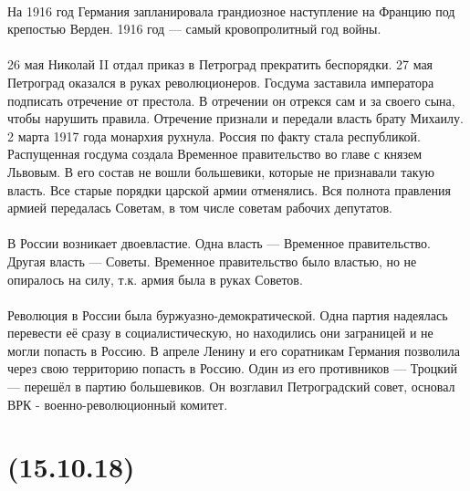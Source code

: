 \documentclass[dvipdfmx]{article}
\begin{document}
\paragraph{}
На 1916 год Германия запланировала грандиозное наступление на Францию под крепостью Верден.
1916 год --- самый кровопролитный год войны.

\paragraph{}
26 мая Николай II отдал приказ в Петроград прекратить беспорядки.
27 мая Петроград оказался в руках революционеров.
Госдума заставила императора подписать отречение от престола. В отречении он отрекся сам и за своего сына, чтобы нарушить
правила. Отречение признали и передали власть брату Михаилу.
2 марта 1917 года монархия рухнула. Россия по факту стала республикой. Распущенная госдума создала Временное правительство
во главе с князем Львовым. В его состав не вошли большевики, которые не признавали такую власть.
Все старые порядки царской армии отменялись. Вся полнота правления армией передалась Советам, в том числе советам рабочих
депутатов.

\paragraph{}
В России возникает двоевластие. Одна власть --- Временное правительство. Другая власть --- Советы. 
Временное правительство было властью, но не опиралось на силу, т.к. армия была в руках Советов.

\paragraph{}
Революция в России была буржуазно-демократической. Одна партия надеялась перевести её сразу в социалистическую,
но находились они заграницей и не могли попасть в Россию.
В апреле Ленину и его соратникам Германия позволила через свою территорию попасть в Россию.
Один из его противников --- Троцкий --- перешёл в партию большевиков. Он возглавил Петроградский совет, основал ВРК -
военно-революционный комитет.

\newpage
\noindent\makebox[\linewidth]{\rule{\paperwidth}{0.4pt}}
\section{(15.10.18)}
\noindent\makebox[\linewidth]{\rule{\paperwidth}{0.4pt}}


\end{document}
